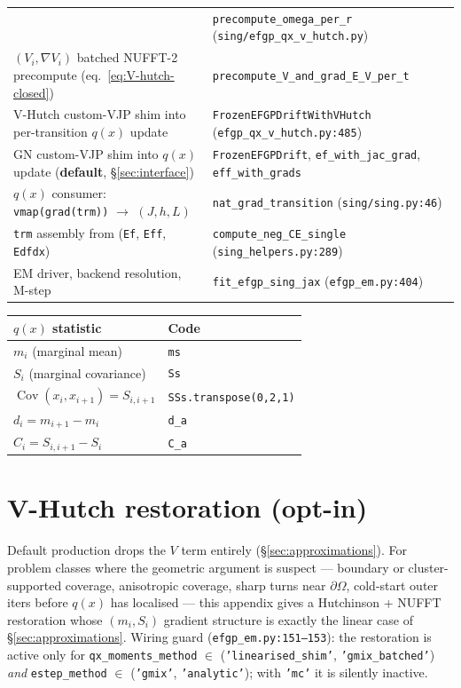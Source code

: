 \documentclass[11pt]{article}
\newcommand{\Cov}{\operatorname{Cov}}
\newcommand{\code}[1]{\texttt{\small #1}}
\begin{document}
\begin{tabular}{@{}p{} p{}@{}}
& \code{precompute\_omega\_per\_r} (\code{sing/efgp\_qx\_v\_hutch.py}) \\
$(V_i, \nabla V_i)$ batched NUFFT-2 precompute (eq.~\ref{eq:V-hutch-closed})
& \code{precompute\_V\_and\_grad\_E\_V\_per\_t} \\
V-Hutch custom-VJP shim into per-transition $q(x)$ update
& \code{FrozenEFGPDriftWithVHutch} (\code{efgp\_qx\_v\_hutch.py:485}) \\
GN custom-VJP shim into $q(x)$ update (\textbf{default}, §\ref{sec:interface})
& \code{FrozenEFGPDrift}, \code{ef\_with\_jac\_grad}, \code{eff\_with\_grads} \\
$q(x)$ consumer: \code{vmap(grad(trm))} $\to$ $(J,h,L)$
& \code{nat\_grad\_transition} (\code{sing/sing.py:46}) \\
\code{trm} assembly from (\code{Ef}, \code{Eff}, \code{Edfdx})
& \code{compute\_neg\_CE\_single} (\code{sing\_helpers.py:289}) \\
EM driver, backend resolution, M-step
& \code{fit\_efgp\_sing\_jax} (\code{efgp\_em.py:404}) \\
\hline
\end{tabular}

\medskip
\noindent
\begin{tabular}{ll}
\hline
$q(x)$ statistic & Code \\
\hline
$m_i$ (marginal mean) & \code{ms} \\
$S_i$ (marginal covariance) & \code{Ss} \\
$\Cov(x_i,x_{i+1}) = S_{i,i+1}$ & \code{SSs.transpose(0,2,1)} \\
$d_i = m_{i+1}-m_i$ & \code{d\_a} \\
$C_i = S_{i,i+1}-S_i$ & \code{C\_a} \\
\hline
\end{tabular}

\section{V-Hutch restoration (opt-in)}
\label{app:vhutch}

Default production drops the $V$ term entirely (§\ref{sec:approximations}). For problem classes where the geometric
argument is suspect --- boundary or cluster-supported coverage,
anisotropic coverage, sharp turns near $\partial\Omega$, cold-start outer
iters before $q(x)$ has localised --- this appendix gives a Hutchinson +
NUFFT restoration whose $(m_i, S_i)$ gradient structure is exactly the
linear case of §\ref{sec:approximations}. Wiring guard
(\code{efgp\_em.py:151--153}): the restoration is active only for
\code{qx\_moments\_method} $\in$ (\code{'linearised\_shim'},
\code{'gmix\_batched'}) \emph{and} \code{estep\_method} $\in$
(\code{'gmix'}, \code{'analytic'}); with \code{'mc'} it is silently
inactive.
\end{document}
